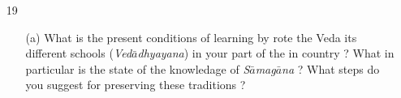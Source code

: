 {\begin{itemize}
  \item[19] \begin{itemize}
            
            \item[(a)] What is the present conditions of learning by rote the Veda its different schools ({\textit {Ved$\bar{a}$dhyayana}}) in your part of the in country ? What in particular is the state of the knowledage of {\textit {S$\bar{a}$mag$\bar{a}$na}} ? What steps do you suggest for preserving these traditions ?
\end{itemize}
\end{itemize}
}
